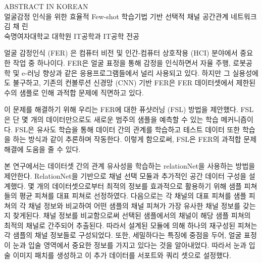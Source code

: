 \newpage
\pagestyle{empty}

\begin{center} {\Large{ABSTRACT IN KOREAN}}
\vspace*{1cm}\\
\Large 얼굴감정 인식을 위한 효율적 Few-shot 학습기법 기반 선택적 채널 공간관계 네트워크
\vspace*{1cm}\\
\normalsize
김 채 린 \\숙명여자대학교 대학원 IT공학과 IT공학 전공
\vspace*{1cm}
\end{center}

\vspace{0.5cm}


얼굴 감정인식 (FER) 은 컴퓨터 비전 및 인간-컴퓨터 상호작용 (HCI) 분야에서 중요한 작업 중 하나이다. FER은 얼굴 표정을 통해 감정을 인식하면서 자율 주행, 로봇공학 및 e-러닝 향상과 같은 응용프로그램들에서 널리 사용되고 있다. 하지만 그 실용성에도 불구하고, 기존의 컨볼루션 신경망 (CNN) 기반 FER은 FER 데이터셋에서 제한된 수의 샘플로 인해 과적합 문제에 직면하고 있다.

이 문제를 해결하기 위해 우리는 FER에 대한 퓨샷러닝 (FSL) 방법을 제안했다. FSL은 단 몇 개의 데이터만으로도 새로운 범주의 샘플을 예측할 수 있는 학습 메커니즘이다. FSL은 유사도 학습을 통해 데이터 간의 관계를 학습하고 
테스트 데이터 또한 학습을 하는 방식과 같이 추론하며 작동한다. 이렇게 함으로써, FSL은 FER의 과적합 문제 해결에 도움을 줄 수 있다.

본 연구에서는 데이터셋 간의 관계 유사성을 학습하는 relationNet을 사용하는 방법을 제안한다. RelationNet을 기반으로 채널 선택 모듈과 추가적인 공간 데이터 구성을 설계했다. 몇 개의 데이터셋으로부터 최적의 정보를 효과적으로 활용하기 위해 샘플 피쳐들의 평균 피쳐를 대표 피쳐로 선정하였다. 다음으로는 각 채널의 대표 피쳐를 샘플 피쳐의 각 채널 정보와 비교하여 어떤 샘플의 채널 피쳐가 가장 유사한 채널 정보를 갖는지 찾게된다. 채널 정보를 비교함으로써 선택된 샘플에서의 채널이 해당 샘플 피쳐의 최적의 채널로 간주되어 추출된다. 따라서 설계된 모듈에 의해 하나의 재구성된 피쳐는 각 샘플의 채널 정보들로 구성되었다. 또한, 세밀하다는 특징에 중점을 두어, 얼굴 표정이 눈과 입술 영역에서 중요한 정보를 가지고 있다는 것을 알아내었다. 따라서 눈과 입술 이미지 패치를 생성하고 이 추가 데이터를 서포트와 쿼리 셋으로 설정했다.

